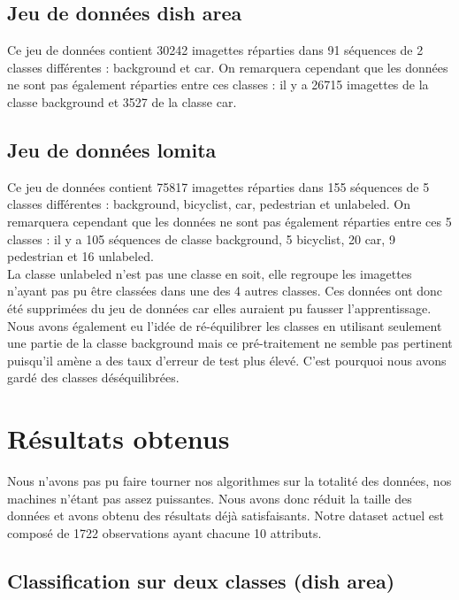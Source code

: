 \subsection{Jeu de données dish area}

	Ce jeu de données contient 30242 imagettes réparties dans 91 séquences de 2 classes différentes : background et car.  On remarquera cependant que les données ne sont pas également réparties entre ces classes : il y a 26715 imagettes de la classe background et 3527 de la classe car.

\subsection{Jeu de données lomita}

	Ce jeu de données contient 75817 imagettes réparties dans 155 séquences de 5 classes différentes : background, bicyclist, car, pedestrian et unlabeled. On remarquera cependant que les données ne sont pas également réparties entre ces 5 classes : il y a 105 séquences de classe background, 5 bicyclist, 20 car, 9 pedestrian et 16 unlabeled. \\

	La classe unlabeled n'est pas une classe en soit, elle regroupe les imagettes n'ayant pas pu être classées dans une des 4 autres classes. Ces données ont donc été supprimées du jeu de données car elles auraient pu fausser l'apprentissage. \\

	Nous avons également eu l'idée de ré-équilibrer les classes en utilisant seulement une partie de la classe background mais ce pré-traitement ne semble pas pertinent puisqu'il amène a des taux d'erreur de test plus élevé. C'est pourquoi nous avons gardé des classes déséquilibrées. \\


\section{Résultats obtenus}

Nous n'avons pas pu faire tourner nos algorithmes sur la totalité des données, nos machines n'étant pas assez puissantes. Nous avons donc réduit la taille des données et avons obtenu des résultats déjà satisfaisants. Notre dataset actuel est composé de 1722 observations ayant chacune 10 attributs.

	\subsection{Classification sur deux classes (dish area)}
